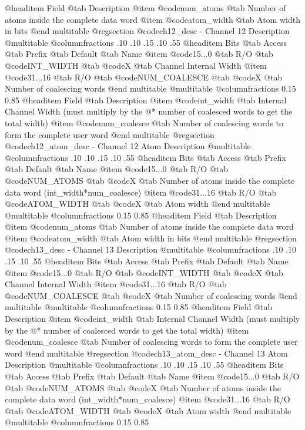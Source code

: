 @headitem Field @tab Description
@item @code{num_atoms} @tab Number of atoms inside the complete data word
@item @code{atom_width} @tab Atom width in bits
@end multitable
@regsection @code{ch12_desc} - Channel 12 Description
@multitable @columnfractions .10 .10 .15 .10 .55
@headitem Bits @tab Access @tab Prefix @tab Default @tab Name
@item @code{15...0}
@tab R/O @tab
@code{INT_WIDTH}
@tab @code{X} @tab 
Channel Internal Width
@item @code{31...16}
@tab R/O @tab
@code{NUM_COALESCE}
@tab @code{X} @tab 
Number of coalescing words
@end multitable
@multitable @columnfractions 0.15 0.85
@headitem Field @tab Description
@item @code{int_width} @tab Internal Channel Width (must multiply by the @* number of coalesced words to get the total width)
@item @code{num_coalesce} @tab Number of coalescing words to form the complete user word
@end multitable
@regsection @code{ch12_atom_desc} - Channel 12 Atom Description
@multitable @columnfractions .10 .10 .15 .10 .55
@headitem Bits @tab Access @tab Prefix @tab Default @tab Name
@item @code{15...0}
@tab R/O @tab
@code{NUM_ATOMS}
@tab @code{X} @tab 
Number of atoms inside the complete data word (int_width*num_coalesce)
@item @code{31...16}
@tab R/O @tab
@code{ATOM_WIDTH}
@tab @code{X} @tab 
Atom width
@end multitable
@multitable @columnfractions 0.15 0.85
@headitem Field @tab Description
@item @code{num_atoms} @tab Number of atoms inside the complete data word
@item @code{atom_width} @tab Atom width in bits
@end multitable
@regsection @code{ch13_desc} - Channel 13 Description
@multitable @columnfractions .10 .10 .15 .10 .55
@headitem Bits @tab Access @tab Prefix @tab Default @tab Name
@item @code{15...0}
@tab R/O @tab
@code{INT_WIDTH}
@tab @code{X} @tab 
Channel Internal Width
@item @code{31...16}
@tab R/O @tab
@code{NUM_COALESCE}
@tab @code{X} @tab 
Number of coalescing words
@end multitable
@multitable @columnfractions 0.15 0.85
@headitem Field @tab Description
@item @code{int_width} @tab Internal Channel Width (must multiply by the @* number of coalesced words to get the total width)
@item @code{num_coalesce} @tab Number of coalescing words to form the complete user word
@end multitable
@regsection @code{ch13_atom_desc} - Channel 13 Atom Description
@multitable @columnfractions .10 .10 .15 .10 .55
@headitem Bits @tab Access @tab Prefix @tab Default @tab Name
@item @code{15...0}
@tab R/O @tab
@code{NUM_ATOMS}
@tab @code{X} @tab 
Number of atoms inside the complete data word (int_width*num_coalesce)
@item @code{31...16}
@tab R/O @tab
@code{ATOM_WIDTH}
@tab @code{X} @tab 
Atom width
@end multitable
@multitable @columnfractions 0.15 0.85
